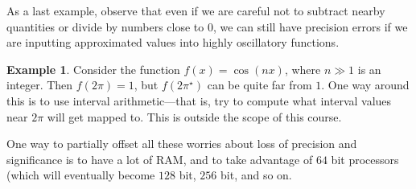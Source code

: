 \documentclass[12pt]{article}
\theoremstyle{plain}
\theoremstyle{definition}
\newtheorem*{example}{Example}
\theoremstyle{remark}
\numberwithin{equation}{section}  %
\begin{document}
As a last example, observe that even if we are careful not to subtract nearby
quantities or divide by numbers close to $0$, we can still have precision errors
if we are inputting approximated values into highly oscillatory functions.
\begin{example}
Consider the function $f(x) = \cos(nx)$, where $n \gg 1$ is an integer.
Then $f(2\pi) = 1$, but $f(2 \pi^\star)$ can be quite far from $1$.
One way around this is to use interval arithmetic---that is, try to
compute what interval values near $2 \pi$ will get mapped to. This is
outside the scope of this course.
\end{example}
One way to partially offset all these worries about loss of precision
and significance is to have a lot of RAM, and to take advantage
of $64$ bit processors (which will eventually become $128$ bit, $256$ bit,
and so on.
\end{document}
